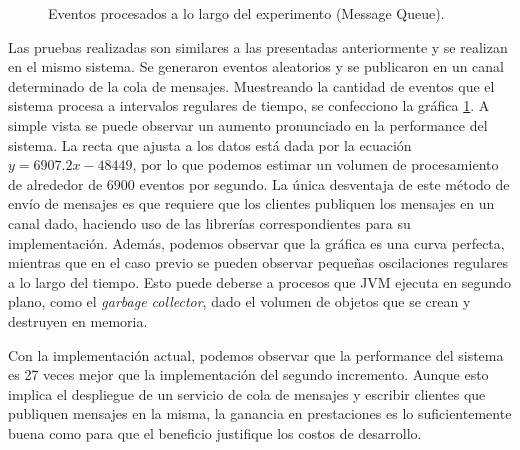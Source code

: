 \documentclass[a4paper,10pt, oneside]{article}
\begin{document}
\begin{figure}[h]
	\centering
	
	\caption{Eventos procesados a lo largo del experimento (Message Queue).} \label{fig:MQ}
\end{figure}

Las pruebas realizadas son similares a las presentadas anteriormente y se realizan en el mismo sistema. Se generaron eventos aleatorios y se publicaron en un canal determinado de la cola de mensajes. Muestreando la cantidad de eventos que el sistema procesa a intervalos regulares de tiempo, se confecciono la gráfica \ref{fig:MQ}. A simple vista se puede observar un aumento pronunciado en la performance del sistema. La recta que ajusta a los datos está dada por la ecuación $y = 6907.2 x - 48449$, por lo que podemos estimar un volumen de procesamiento de alrededor de $6900$ eventos por segundo. La única desventaja de este método de envío de mensajes es que requiere que los clientes publiquen los mensajes en un canal dado, haciendo uso de las librerías correspondientes para su implementación. Además, podemos observar que la gráfica es una curva perfecta, mientras que en el caso previo se pueden observar pequeñas oscilaciones regulares a lo largo del tiempo. Esto puede deberse a procesos que JVM ejecuta en segundo plano, como el \textit{garbage collector}, dado el volumen de objetos que se crean y destruyen en memoria.

Con la implementación actual, podemos observar que la performance del sistema es 27 veces mejor que la implementación del segundo incremento. Aunque esto implica el despliegue de un servicio de cola de mensajes y escribir clientes que publiquen mensajes en la misma, la ganancia en prestaciones es lo suficientemente buena como para que el beneficio justifique los costos de desarrollo.
\end{document}
